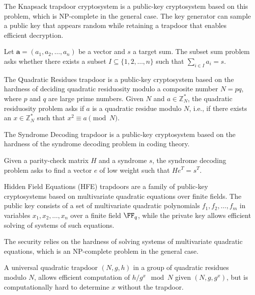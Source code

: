 \documentclass{iacrcc}
\begin{document}
The Knapsack trapdoor cryptosystem is a public-key cryptosystem based on this problem, which is NP-complete in the general case. The key generator can sample a public key that appears random while retaining a trapdoor that enables efficient decryption.

\begin{definition}
Let $\mathbf{a} = (a_1, a_2, \ldots, a_n)$ be a vector and $s$ a target sum. The subset sum problem asks whether there exists a subset $I \subseteq \{1, 2, \ldots, n\}$ such that $\sum_{i \in I} a_i = s$.
\end{definition}

\begin{definition}
The Quadratic Residues trapdoor is a public-key cryptosystem based on the hardness of deciding quadratic residuosity modulo a composite number $N = pq$, where $p$ and $q$ are large prime numbers. Given $N$ and $a \in \mathbb{Z}_N^*$, the quadratic residuosity problem asks if $a$ is a quadratic residue modulo $N$, i.e., if there exists an $x \in \mathbb{Z}_N^*$ such that $x^2 \equiv a \pmod{N}$.
\end{definition}

The Syndrome Decoding trapdoor is a public-key cryptosystem based on the hardness of the syndrome decoding problem in coding theory.

\begin{definition}
Given a parity-check matrix $H$ and a syndrome $s$, the syndrome decoding problem asks to find a vector $e$ of low weight such that $H e^T = s^T$.
\end{definition}

\begin{definition}
Hidden Field Equations (HFE) trapdoors are a family of public-key cryptosystems based on multivariate quadratic equations over finite fields. The public key consists of a set of multivariate quadratic polynomials $f_1, f_2, \ldots, f_m$ in variables $x_1, x_2, \ldots, x_n$ over a finite field $\FF_q$, while the private key allows efficient solving of systems of such equations.
\end{definition}

The security relies on the hardness of solving systems of multivariate quadratic equations, which is an NP-complete problem in the general case.

\begin{definition}
A universal quadratic trapdoor $(N, g, h)$ in a group of quadratic residues modulo $N$, allows efficient computation of $h/g^x \mod N$ given $(N, g, g^x)$, but is computationally hard to determine $x$ without the trapdoor.
\end{definition}
\end{document}
